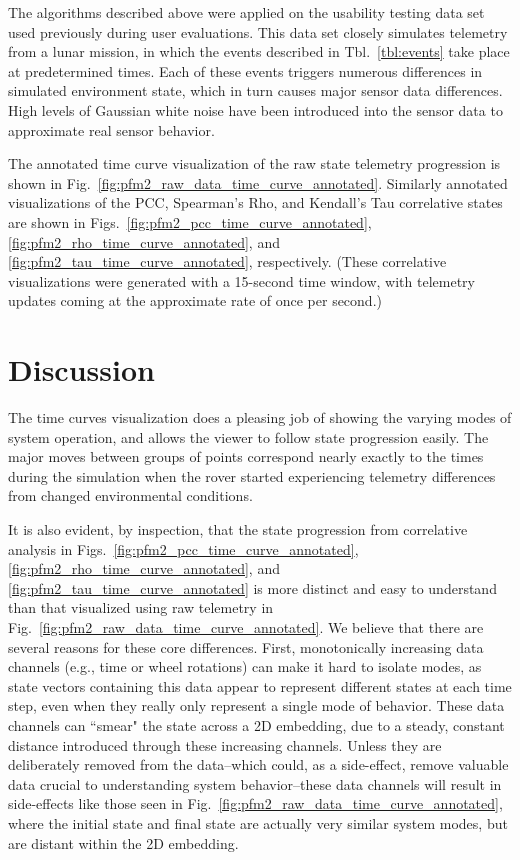 The algorithms described above were applied on the usability testing data set used previously during user evaluations. This data set closely simulates telemetry from a lunar mission, in which the events described in Tbl.~\ref{tbl:events} take place at predetermined times. Each of these events triggers numerous differences in simulated environment state, which in turn causes major sensor data differences. High levels of Gaussian white noise have been introduced into the sensor data to approximate real sensor behavior.

The annotated time curve visualization of the raw state telemetry progression is shown in Fig.~\ref{fig:pfm2_raw_data_time_curve_annotated}. Similarly annotated visualizations of the PCC, Spearman's Rho, and Kendall's Tau correlative states are shown in Figs.~\ref{fig:pfm2_pcc_time_curve_annotated}, \ref{fig:pfm2_rho_time_curve_annotated}, and \ref{fig:pfm2_tau_time_curve_annotated}, respectively. (These correlative visualizations were generated with a 15-second time window, with telemetry updates coming at the approximate rate of once per second.)

\section{Discussion}

The time curves visualization does a pleasing job of showing the varying modes of system operation, and allows the viewer to follow state progression easily. The major moves between groups of points correspond nearly exactly to the times during the simulation when the rover started experiencing telemetry differences from changed environmental conditions.

It is also evident, by inspection, that the state progression from correlative analysis in Figs.~\ref{fig:pfm2_pcc_time_curve_annotated}, \ref{fig:pfm2_rho_time_curve_annotated}, and \ref{fig:pfm2_tau_time_curve_annotated} is more distinct and easy to understand than that visualized using raw telemetry in Fig.~\ref{fig:pfm2_raw_data_time_curve_annotated}. We believe that there are several reasons for these core differences. First, monotonically increasing data channels (e.g., time or wheel rotations) can make it hard to isolate modes, as state vectors containing this data appear to represent different states at each time step, even when they really only represent a single mode of behavior. These data channels can ``smear" the state across a 2D embedding, due to a steady, constant distance introduced through these increasing channels. Unless they are deliberately removed from the data--which could, as a side-effect, remove valuable data crucial to understanding system behavior--these data channels will result in side-effects like those seen in Fig.~\ref{fig:pfm2_raw_data_time_curve_annotated}, where the initial state and final state are actually very similar system modes, but are distant within the 2D embedding.

